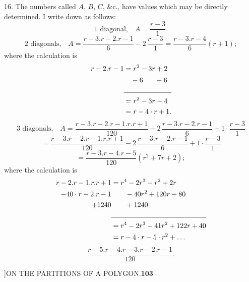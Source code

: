 \documentclass[11pt]{article}
\begin{document}
\hspace{1em} 16. The numbers called $A$, $B$, $C$, \&c., have values which may
be directly determined. I write down as follows:
\[
\text{1 diagonal,}\quad A=\frac{r-3}{1}.
\]
\[
\text{2 diagonals,}\quad A=\frac{r-3.r-2.r-1}{6}-2\,\frac{r-3}{1}=\frac{r-3.r-4}{6}(r+1);
\]
where the calculation is
\[
\begin{aligned}
r-2.r-1 &= r^{2}-3r+2\\
       &\quad -6\phantom{r^{2}-}-6\\
\cline{2-2}
       &= r^{2}-3r-4\\
       &= r-4\cdot r+1.
\end{aligned}
\]
\[
\text{3 diagonals,}\quad A=\frac{r-3.r-2.r-1.r.r+1}{120}-2\,\frac{r-3.r-2.r-1}{6}+1\cdot\frac{r-3}{1}
\]
\[
=\frac{r-3.r-2.r-1.r.r+1}{120}-2\,\frac{r-3.r-2.r-1}{6}+1\cdot\frac{r-3}{1}
\]
\[
=\frac{r-3.r-4.r-5}{120}(r^{2}+7r+2);
\]
where the calculation is
\[
\begin{aligned}
r-2.r-1.r.r+1 &= r^{4}-2r^{3}-r^{2}+2r\\
-40\cdot r-2.r-1 &\hspace{2em} -40r^{2}+120r-80\\
       +1240 &\hspace{2em} +1240\\
\cline{2-2}
       &= r^{4}-2r^{3}-41r^{2}+122r+40\\
       &= r-4\cdot r-5\cdot r^{2}+\ldots
\end{aligned}
\]
\[
\frac{r-5.r-4.r-3.r-2.r-1}{120}.
\]

\newpage
{}]\hfill ON THE PARTITIONS OF A POLYGON.\hfill\textbf{103}
\end{document}
